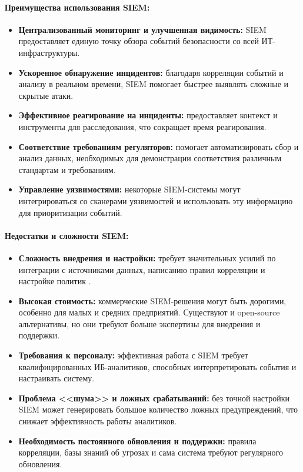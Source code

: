 \paragraph*{Преимущества использования SIEM:}
\begin{itemize}
    \item \textbf{Централизованный мониторинг и улучшенная видимость:} SIEM предоставляет единую точку обзора событий безопасности со всей ИТ-инфраструктуры.
    \item \textbf{Ускоренное обнаружение инцидентов:} благодаря корреляции событий и анализу в реальном времени, SIEM помогает быстрее выявлять сложные и скрытые атаки.
    \item \textbf{Эффективное реагирование на инциденты:} предоставляет контекст и инструменты для расследования, что сокращает время реагирования.
    \item \textbf{Соответствие требованиям регуляторов:} помогает автоматизировать сбор и анализ данных, необходимых для демонстрации соответствия различным стандартам и требованиям.
    \item \textbf{Управление уязвимостями:} некоторые SIEM-системы могут интегрироваться со сканерами уязвимостей и использовать эту информацию для приоритизации событий.
\end{itemize}

\paragraph*{Недостатки и сложности SIEM:}
\begin{itemize}
    \item \textbf{Сложность внедрения и настройки:} требует значительных усилий по интеграции с источниками данных, написанию правил корреляции и настройке политик \cite{SIEMSec}.
    \item \textbf{Высокая стоимость:} коммерческие SIEM-решения могут быть дорогими, особенно для малых и средних предприятий. Существуют и open-source альтернативы, но они требуют больше экспертизы для внедрения и поддержки.
    \item \textbf{Требования к персоналу:} эффективная работа с SIEM требует квалифицированных ИБ-аналитиков, способных интерпретировать события и настраивать систему.
    \item \textbf{Проблема <<шума>> и ложных срабатываний:} без точной настройки SIEM может генерировать большое количество ложных предупреждений, что снижает эффективность работы аналитиков.
    \item \textbf{Необходимость постоянного обновления и поддержки:} правила корреляции, базы знаний об угрозах и сама система требуют регулярного обновления.
\end{itemize}

